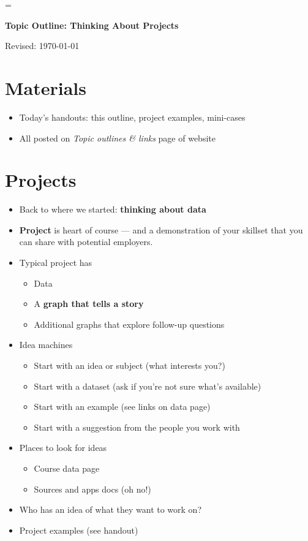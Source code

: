 \documentclass[11pt]{article}
\begin{document}
\parskip=\bigskipamount
\parindent=0.0in
\thispagestyle{empty}


\bigskip\bigskip
\centerline{\Large \bf Topic Outline:  Thinking About Projects}
\centerline{Revised: \today}

\section*{Materials}

\begin{itemize}
\item  Today's handouts:  this outline, project examples, mini-cases 
\item  All posted on {\it Topic outlines \& links\/} page of website 
\end{itemize}


\section*{Projects}

\begin{itemize}
\item Back to where we started:  {\bf thinking about data} 

\item {\bf Project} is heart of course --- and a demonstration of your skillset
that you can share with potential employers.   

\item Typical project has 
\begin{itemize}
\item Data 
\item A {\bf graph that tells a story\/} 
\item Additional graphs that explore follow-up questions 
\end{itemize}

\item Idea machines
\begin{itemize}
\item Start with an idea or subject (what interests you?)
\item Start with a dataset (ask if you're not sure what's available)
\item Start with an example (see links on data page)
\item Start with a suggestion from the people you work with
\end{itemize}

\item Places to look for ideas 
\begin{itemize}
\item Course data page 
\item Sources and apps docs (oh no!) 
\end{itemize} 

\item Who has an idea of what they want to work on?  

\item Project examples (see handout) 
\end{itemize}
\end{document}
